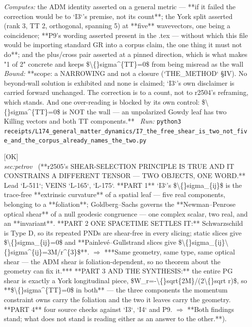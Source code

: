 \begin{description}
\emph{Computes:} the ADM identity asserted on a general metric --- **if it failed the correction would be to `I3`'s premise, not its count**; the York split asserted (rank 3, TT 2, orthogonal, spanning 5) at **five** wavevectors, one being a coincidence; **P9's wording asserted present in the .tex --- without which this file would be importing standard GR into a corpus claim, the one thing it must not do**; and the plus/cross pair asserted at a pinned direction, which is what makes "1 of 2" concrete and keeps \$\textbackslash\{\}sigma\textasciicircum{}\{TT\}=0\$ from being misread as the wall
 \emph{Bound:} **scope: a NARROWING and not a closure (`THE\_METHOD` \S{}IV). No beyond-wall solution is exhibited and none is claimed; `I3`'s own disclaimer is carried forward unchanged. The correction is to a count, not to r2504's reframing, which stands.  And one over-reading is blocked by its own control: \$\textbackslash\{\}sigma\textasciicircum{}\{TT\}=0\$ is NOT the wall --- an unpolarized Gowdy leaf has two Killing vectors and both TT components.**
\ \emph{Run:} \texttt{python3 receipts/L174\_general\_matter\_dynamics/I7\_the\_free\_shear\_is\_two\_not\_five\_and\_the\_corpus\_already\_names\_the\_two.py}
\item[\label{rcpt:I6_two_objects_one_word_the_optical_shear_is_not_the_ADM_shear}\texttt{I6\_two\_objects\_one\_word\_the\_optical\_shear\_is\_not\_the\_ADM\_shear}]\hfill\textsf{[OK]}\\
\textit{sec:petrov} \ (**r2505's SHEAR-SELECTION PRINCIPLE IS TRUE AND IT CONSTRAINS A DIFFERENT TENSOR --- TWO OBJECTS, ONE WORD.** Lead `L-511`; VEINS `L-165`, `L-175`. **PART 1** `I3`'s \$\textbackslash\{\}sigma\_\{ij\}\$ is the trace-free **extrinsic curvature** of a spatial leaf --- five real components, belonging to a **foliation**; Goldberg--Sachs governs the **Newman--Penrose optical shear** of a null geodesic congruence --- one complex scalar, two real, and an **invariant**. **PART 2 ONE SPACETIME SETTLES IT:** Schwarzschild is Type D, so its repeated PNDs are shear-free in every slicing; static slices give \$\textbackslash\{\}sigma\_\{ij\}=0\$ and **Painlevé--Gullstrand slices give \$\textbackslash\{\}sigma\_\{ij\}\textbackslash\{\}sigma\textasciicircum{}\{ij\}=3M/r\textasciicircum{}\{3\}\$**. \ensuremath{\Rightarrow} ***Same geometry, same type, same optical shear --- the ADM shear is foliation-dependent, so no theorem about the geometry can fix it.*** **PART 3 AND THE SYNTHESIS:** the entire PG shear is exactly a York longitudinal piece, \$W\_r=-\textbackslash\{\}sqrt\{2M\}/(2\textbackslash\{\}sqrt r)\$, so **\$\textbackslash\{\}sigma\textasciicircum{}\{TT\}=0\$ in both** --- the three components the momentum constraint owns carry the foliation and the two it leaves carry the geometry. **PART 4** four source checks against `I3`, `I4` and P9. \ensuremath{\Rightarrow} **Both findings stand; what does not stand is reading either as an answer to the other.**). 

\end{description}
